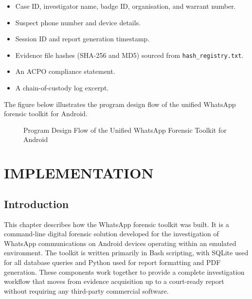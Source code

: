 \documentclass[12pt,a4paper]{report}
\begin{document}
\begin{itemize}
    \item Case ID, investigator name, badge ID, organisation, and warrant number.
    \item Suspect phone number and device details.
    \item Session ID and report generation timestamp.
    \item Evidence file hashes (SHA-256 and MD5) sourced from \texttt{hash\_registry.txt}.
    \item An ACPO compliance statement.
    \item A chain-of-custody log excerpt.
\end{itemize}

The figure below illustrates the program design flow of the unified WhatsApp forensic toolkit for Android.

\begin{figure}[h]
    \centering
    \caption{Program Design Flow of the Unified WhatsApp Forensic Toolkit for Android}
    \label{fig:program_design_flow}
\end{figure}

\newpage
\chapter{IMPLEMENTATION}

\section{Introduction}

This chapter describes how the WhatsApp forensic toolkit was built. It is a command-line digital forensic solution developed for the investigation of WhatsApp communications on Android devices operating within an emulated environment. The toolkit is written primarily in Bash scripting, with SQLite used for all database queries and Python used for report formatting and PDF generation. These components work together to provide a complete investigation workflow that moves from evidence acquisition up to a court-ready report without requiring any third-party commercial software.
\end{document}
